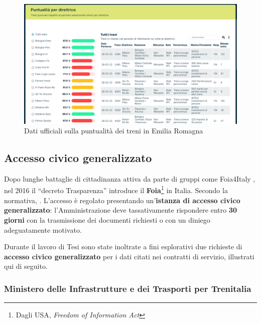 \documentclass[12pt,italian]{report}
\begin{document}
\begin{figure}[h] \centering
    \includegraphics[width=1\textwidth]{images/fer_dati.png}
	\caption{Dati ufficiali sulla puntualità dei treni in Emilia
        Romagna \cite{FerDati}}
    \label{fer_dati}
\end{figure}


\subsection{Accesso civico generalizzato}

Dopo lunghe battaglie di cittadinanza attiva da parte di gruppi come
Foia4Italy \cite{SilenziDiStato}, nel 2016 il ``decreto Trasparenza''
\cite{Dlgs97} introduce il \textbf{Foia}\footnote{Dagli USA,
    \textit{Freedom of Information Act}} in Italia.  Secondo la
normativa, .
L'accesso è regolato presentando un'\textbf{istanza di accesso civico
    generalizzato}: l'Amministrazione deve tassativamente rispondere
entro \textbf{30 giorni} con la trasmissione dei documenti richiesti o
con un diniego adeguatamente motivato.

Durante il lavoro di Tesi sono state inoltrate a fini esplorativi due
richieste di \textbf{accesso civico generalizzato} per i dati citati
nei contratti di servizio, illustrati qui di seguito.

\subsubsection{Ministero delle Infrastrutture e dei Trasporti per
    Trenitalia}
\end{document}
